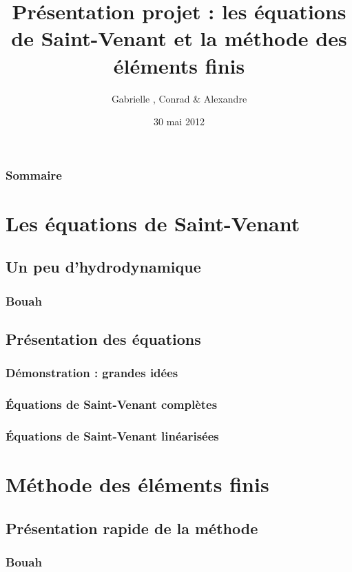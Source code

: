 \documentclass[handout]{beamer}
\title[Saint-Venant]{Présentation projet : les équations de Saint-Venant et la méthode des éléments finis}
\author{Gabrielle \bsc{Collette}, Conrad \bsc{Hillairet} \& Alexandre \bsc{Vieira}}
\institute{INSA de Rouen}
\date{30 mai 2012}
\begin{document}
\begin{frame}
\titlepage
\end{frame}

\begin{frame}
	\frametitle{Sommaire}
	\tableofcontents
\end{frame}

\section{Les équations de Saint-Venant}
\subsection[Hydrodynam.]{Un peu d'hydrodynamique} %
 
\begin{frame}
	\frametitle{Bouah}

\end{frame}

\subsection[Équations]{Présentation des équations}

\begin{frame}
	\frametitle{Démonstration : grandes idées}

\end{frame}

\begin{frame}
	\frametitle{Équations de Saint-Venant complètes}

\end{frame}

\begin{frame}
	\frametitle{Équations de Saint-Venant linéarisées}

\end{frame}

\section{Méthode des éléments finis}
\subsection[Présentation]{Présentation rapide de la méthode}
\begin{frame}
	\frametitle{Bouah}

\end{frame}
\end{document}
